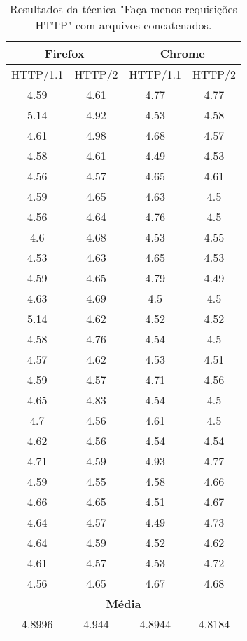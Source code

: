 \begin{table}[h]
	\centering
	\caption{Resultados da técnica "Faça menos requisições HTTP" com arquivos concatenados.}
	\label{resultados-facamenosrequisicoeshttp-concatenados}
	\begin{tabular}{cccc}
		\hline
		\multicolumn{2}{c}{\textbf{Firefox}} & \multicolumn{2}{c}{\textbf{Chrome}} \\
		\hline
		HTTP/1.1 & HTTP/2 & HTTP/1.1 & HTTP/2 \\
		\hline
		4.59 & 4.61 & 4.77 & 4.77 \\
		5.14 & 4.92 & 4.53 & 4.58 \\
		4.61 & 4.98 & 4.68 & 4.57 \\
		4.58 & 4.61 & 4.49 & 4.53 \\
		4.56 & 4.57 & 4.65 & 4.61 \\
		4.59 & 4.65 & 4.63 & 4.5  \\
		4.56 & 4.64 & 4.76 & 4.5  \\
		4.6  & 4.68 & 4.53 & 4.55 \\
		4.53 & 4.63 & 4.65 & 4.53 \\
		4.59 & 4.65 & 4.79 & 4.49 \\
		4.63 & 4.69 & 4.5  & 4.5  \\
		5.14 & 4.62 & 4.52 & 4.52 \\
		4.58 & 4.76 & 4.54 & 4.5  \\
		4.57 & 4.62 & 4.53 & 4.51 \\
		4.59 & 4.57 & 4.71 & 4.56 \\
		4.65 & 4.83 & 4.54 & 4.5  \\
		4.7  & 4.56 & 4.61 & 4.5  \\
		4.62 & 4.56 & 4.54 & 4.54 \\
		4.71 & 4.59 & 4.93 & 4.77 \\
		4.59 & 4.55 & 4.58 & 4.66 \\
		4.66 & 4.65 & 4.51 & 4.67 \\
		4.64 & 4.57 & 4.49 & 4.73 \\
		4.64 & 4.59 & 4.52 & 4.62 \\
		4.61 & 4.57 & 4.53 & 4.72 \\
		4.56 & 4.65 & 4.67 & 4.68 \\
		\hline
		\multicolumn{4}{c}{\textbf{Média}} \\
		4.8996 & 4.944 & 4.8944 & 4.8184 \\
		\hline
	\end{tabular}
\end{table}